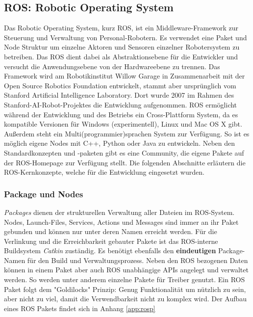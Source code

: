 \subsection{ROS: Robotic Operating System}
\label{sec:basic-ros}
    
Das Robotic Operating System, kurz ROS, ist ein Middleware-Framework zur Steuerung und Verwaltung von Personal-Robotern. Es verwendet eine Paket und Node Struktur um einzelne Aktoren und Sensoren einzelner Robotersystem zu betreiben. Das ROS dient dabei als Abstraktionsebene für die Entwickler und versucht die Anwendungsebene von der Hardwareebene zu trennen. Das Framework wird am Robotikinstitut Willow Garage in Zusammenarbeit mit der Open Source Robotics Foundation entwickelt, stammt aber ursprünglich vom Stanford Artificial Intelligence Laboratory. Dort wurde 2007 im Rahmen des Stanford-AI-Robot-Projektes die Entwicklung aufgenommen. ROS ermöglicht während der Entwicklung und des Betriebs ein Cross-Plattform System, da es kompatible Versionen für Windows (experimentell), Linux und Mac OS X gibt. Außerdem steht ein Multi(programmier)sprachen System zur Verfügung. So ist es möglich eigene Nodes mit C++, Python oder Java zu entwickeln.\cite{quigley2009ros} Neben den Standardkonzepten und -paketen gibt es eine Community, die eigene Pakete auf der ROS-Homepage zur Verfügung stellt. Die folgenden Abschnitte erläutern die ROS-Kernkonzepte, welche für die Entwicklung eingesetzt wurden.

\subsubsection{Package und Nodes}

\textit{Packages} dienen der strukturellen Verwaltung aller Dateien im ROS-System. Nodes, Launch-Files, Services, Actions und Messages sind immer an ihr Paket gebunden und können nur unter deren Namen erreicht werden. Für die Verlinkung und die Erreichbarkeit gebauter Pakete ist das ROS-interne Buildsystem \textit{Catkin} zuständig. Es benötigt ebenfalls den \textbf{eindeutigen} Package-Namen für den Build und Verwaltungsprozess. Neben den ROS bezogenen Daten können in einem Paket aber auch ROS unabhängige APIs angelegt und verwaltet werden. So werden unter anderem einzelne Pakete für Treiber genutzt. Ein ROS Paket folgt dem "Goldilocks" Prinzip: Genug Funktionalität um nützlich zu sein, aber nicht zu viel, damit die Verwendbarkeit nicht zu komplex wird. Der Aufbau eines ROS Pakets findet sich in Anhang \ref{app:rosp}

